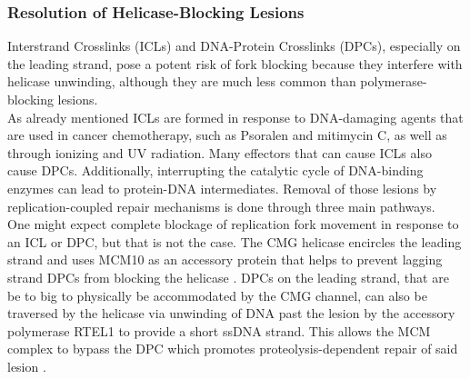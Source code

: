 \subsubsection{Resolution of Helicase-Blocking Lesions}
\label{sec:iclrepair}
Interstrand Crosslinks (ICLs) and DNA-Protein Crosslinks (DPCs), especially on the leading strand, pose a potent risk of fork blocking because they interfere with helicase unwinding, although they are much less common than polymerase-blocking lesions.\\
As already mentioned ICLs are formed in response to DNA-damaging agents that are used in cancer chemotherapy, such as Psoralen and mitimycin C, as well as through ionizing and UV radiation. Many effectors that can cause ICLs also cause DPCs. Additionally, interrupting the catalytic cycle of DNA-binding enzymes can lead to protein-DNA intermediates. Removal of those lesions by replication-coupled repair mechanisms is done through three main pathways.\\
One might expect complete blockage of replication fork movement in response to an ICL or DPC, but that is not the case. The CMG helicase encircles the leading strand and uses MCM10 as an accessory protein that helps to prevent lagging strand DPCs from blocking the helicase \citep{Langston.2017}. DPCs on the leading strand, that are be to big to physically be accommodated by the CMG channel, can also be traversed by the helicase via unwinding of DNA past the lesion by the accessory polymerase RTEL1 to provide a short ssDNA strand. This allows the MCM complex to bypass the DPC which promotes proteolysis-dependent repair of said lesion \citep{Sparks.2019}.\\
